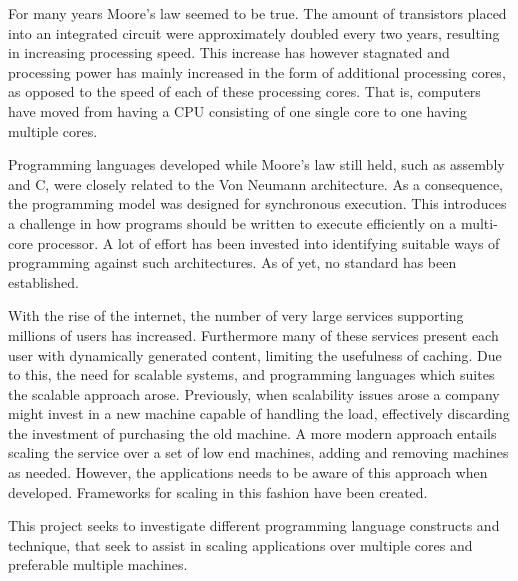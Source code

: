 \makeatletter {}\makeatother
{}
For many years Moore's law\cite{moore1965cramming} seemed to be true. The amount of transistors placed into an integrated circuit were approximately doubled every two years, resulting in increasing processing speed. This increase has however stagnated and processing power has mainly increased in the form of additional processing cores, as opposed to the speed of each of these processing cores. That is, computers have moved from having a \ac{CPU} consisting of one single core to one having multiple cores. 

Programming languages developed while Moore's law still held, such as assembly and C, were closely related to the Von Neumann architecture. As a consequence, the programming model was designed for synchronous execution. This introduces a challenge in how programs should be written to execute efficiently on a multi-core processor. A lot of effort has been invested into identifying suitable ways of programming against such architectures. As of yet, no standard has been established. 

With the rise of the internet, the number of very large services supporting millions of users has increased. Furthermore many of these services present each user with dynamically generated content, limiting the usefulness of caching. Due to this, the need for scalable systems, and programming languages which suites the scalable approach arose. Previously, when scalability issues arose a company might invest in a new machine capable of handling the load, effectively discarding the investment of purchasing the old machine\cite[p. 2]{haller2007actors}. A more modern approach entails scaling the service over a set of low end machines, adding and removing machines as needed. However, the applications needs to be aware of this approach when developed. Frameworks for scaling in this fashion have been created\cite{haller2007actors}\cite{krohn2004building}.


This project seeks to investigate different programming language constructs and technique, that seek to assist in scaling applications over multiple cores and preferable multiple machines.



 
\worksheetend
